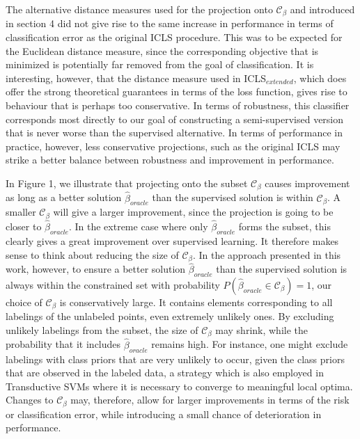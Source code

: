 \documentclass{llncs}
\newcommand{\Cb}{\mathcal{C}_{\beta}}
\begin{document}
The alternative distance measures used for the projection onto $\Cb$ and introduced in section 4 did not give rise to the same increase in performance in terms of classification error as the original ICLS procedure. This was to be expected for the Euclidean distance measure, since the corresponding objective that is minimized is potentially far removed from the goal of classification. It is interesting, however, that the distance measure used in ICLS$_{extended}$, which does offer the strong theoretical guarantees in terms of the loss function, gives rise to behaviour that is perhaps too conservative. In terms of robustness, this classifier corresponds most directly to our goal of constructing a semi-supervised version that is never worse than the supervised alternative. In terms of performance in practice, however, less conservative projections, such as the original ICLS may strike a better balance between robustness and improvement in performance.

In Figure 1, we illustrate that projecting onto the subset $\Cb$ causes improvement as long as a better solution $\hat{\beta}_{oracle}$ than the supervised solution is within $\Cb$. A smaller $\Cb$ will give a larger improvement, since the projection is going to be closer to $\hat{\beta}_{oracle}$. In the extreme case where only $\hat{\beta}_{oracle}$ forms the subset, this clearly gives a great improvement over supervised learning. It therefore makes sense to think about reducing the size of $\Cb$. In the approach presented in this work, however, to ensure a better solution $\hat{\beta}_{oracle}$ than the supervised solution is always within the constrained set with probability $P(\hat{\beta}_{oracle} \in \Cb)=1$, our choice of $\Cb$ is conservatively large. It contains elements corresponding to all labelings of the unlabeled points,  even extremely unlikely ones. By excluding unlikely labelings from the subset, the size of $\Cb$ may shrink, while the probability that it includes $\hat{\beta}_{oracle}$ remains high. For instance, one might exclude labelings with class priors that are very unlikely to occur, given the class priors that are observed in the labeled data, a strategy which is also employed in Transductive SVMs where it is necessary to converge to meaningful local optima. Changes to $\Cb$ may, therefore, allow for larger improvements in terms of the risk or classification error, while introducing a small chance of deterioration in performance.
\end{document}

